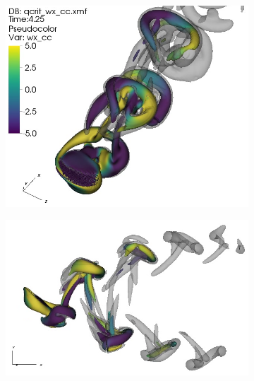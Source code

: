 \documentclass{parcfd}
\begin{document}
\begin{figure}
    \centering
    \begin{subfigure}{0.4\textwidth}
        \includegraphics[width=\linewidth]{rollingpitching_perspective.png}
        \caption{}
        \label{fig:rollingpitching:perspective}
    \end{subfigure}
    \hspace*{1cm}
    \begin{minipage}{0.3\textwidth}
        \begin{subfigure}{\linewidth}
            \includegraphics[width=\linewidth]{rollingpitching_side_view.png}
            \caption{}
            \label{fig:rollingpitching:side_view}
        \end{subfigure}

\end{minipage}
\end{figure}
\end{document}

